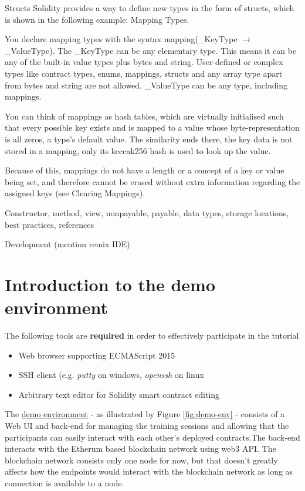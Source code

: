 \documentclass[a4paper]{article}
\begin{document}
Structs
Solidity provides a way to define new types in the form of structs, which is shown in the following example:
Mapping Types.

You declare mapping types with the syntax mapping(\_KeyType $\rightarrow$ \_ValueType).
The \_KeyType can be any elementary type. This means it can be any of the built-in value types plus bytes and string. User-defined or complex types like contract types, enums, mappings, structs and any array type apart from bytes and string are not allowed. \_ValueType can be any type, including mappings.

You can think of mappings as hash tables, which are virtually initialised such that every possible key exists and is mapped to a value whose byte-representation is all zeros, a type’s default value. The similarity ends there, the key data is not stored in a mapping, only its keccak256 hash is used to look up the value.

Because of this, mappings do not have a length or a concept of a key or value being set, and therefore cannot be erased without extra information regarding the assigned keys (see Clearing Mappings).

Constructor, method, view, nonpayable, payable, data types, storage locations, best practices, references 

Development (mention remix IDE)

\section{Introduction to the demo environment}

The following tools are \textbf{required} in order to effectively participate in the tutorial
\begin{itemize}
    \item Web browser supporting ECMAScript 2015
    \item SSH client (e.g. \emph{putty} on windows, \emph{openssh} on linux
    \item Arbitrary text editor for Solidity smart contract editing
\end{itemize}{}

The \href{https://blockchain.cnsm2019-tutorial.com/}{demo environment} - as illustrated by Figure \ref{fig:demo-env} - consists of a Web UI and back-end for managing the training sessions and allowing that the participants can easily interact with each other's deployed contracts.The back-end interacts with the Etherum based blockchain network using web3 API. The blockchain network consists only one node for now, but that doesn't greatly affects how the endpoints would interact with the blockchain network as long as connection is available to a node.
\end{document}
